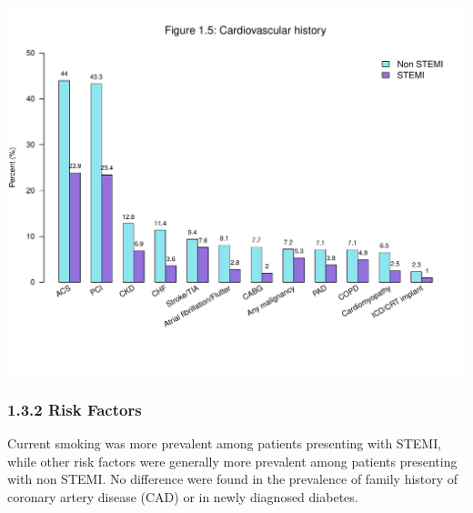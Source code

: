 \documentclass[
]{article}
\begin{document}
\includegraphics{‏‏ACSIS_2024_v1_with_trend_pdf_files/figure-latex/unnamed-chunk-19-1.pdf}

\pagebreak

\subsubsection{1.3.2 Risk Factors}\label{risk-factors}

Current smoking was more prevalent among patients presenting with STEMI,
while other risk factors were generally more prevalent among patients
presenting with non STEMI. No difference were found in the prevalence of
family history of coronary artery disease (CAD) or in newly diagnosed
diabetes.

~
\end{document}
